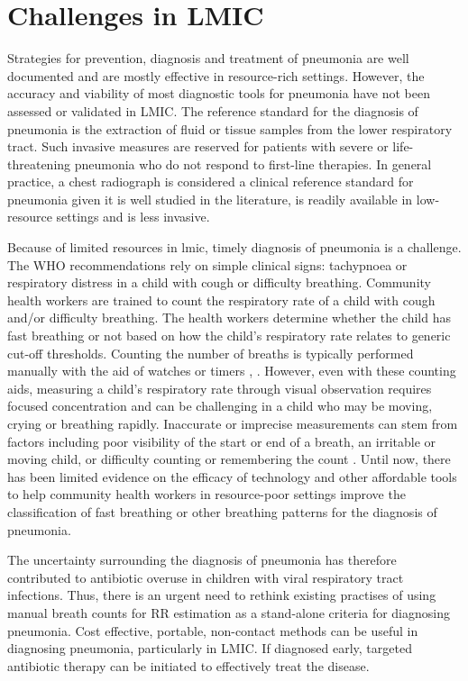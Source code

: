 \section{Challenges in LMIC}

Strategies for prevention, diagnosis and treatment of pneumonia are well documented and are mostly effective in resource-rich settings. However, the accuracy and viability of most diagnostic tools for pneumonia have not been assessed or validated in LMIC. The reference standard for the diagnosis of pneumonia is the extraction of fluid or tissue samples from the lower respiratory tract. Such invasive measures are reserved for patients with severe or life-threatening pneumonia who do not respond to first-line therapies. In general practice, a chest radiograph is considered a clinical reference standard for pneumonia given it is well studied in the literature, is readily available in low-resource settings and is less invasive. 

Because of limited resources in  \gls{lmic}, timely diagnosis of pneumonia is a challenge. The WHO recommendations rely on simple clinical signs: tachypnoea or respiratory distress in a child with cough or difficulty breathing. Community health workers are trained to count the respiratory rate of a child with cough and/or difficulty breathing. The health workers determine whether the child has fast breathing or not based on how the child’s respiratory rate relates to generic cut-off thresholds. Counting the number of breaths is typically performed manually with the aid of watches or timers \cite {gadomski1993assessment}, \cite {noordam2015use}. However, even with these counting aids, measuring a child’s respiratory rate through visual observation requires focused concentration and can be challenging in a child who may be moving, crying or breathing rapidly. Inaccurate or imprecise measurements can stem from factors including poor visibility of the start or end of a breath, an irritable or moving child, or difficulty counting or remembering the count \cite{ginsburg2018systematic}. Until now, there has been limited evidence on the efficacy of technology and other affordable tools to help community health workers in resource-poor settings improve the classification of fast breathing or other breathing patterns for the diagnosis of pneumonia.

The uncertainty surrounding the diagnosis of pneumonia has therefore contributed to antibiotic overuse in children with viral respiratory tract infections. Thus, there is an urgent need to rethink existing practises of using manual breath counts for RR estimation as a stand-alone criteria for diagnosing pneumonia. Cost effective, portable, non-contact methods can be useful in diagnosing pneumonia, particularly in LMIC. If diagnosed early, targeted antibiotic therapy can be initiated to effectively treat the disease. 

